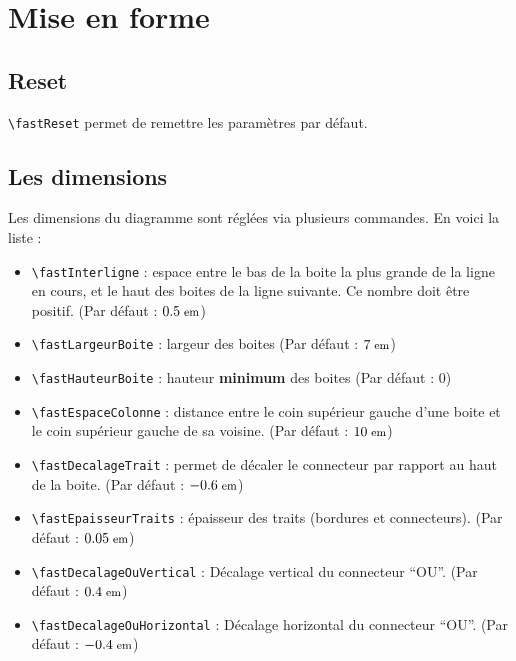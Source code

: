 \section{Mise en forme}\label{MIP}

	\subsection{Reset}\label{reset}

		{\color{blue}\verb'\fastReset'} permet de remettre les paramètres par défaut.



	\subsection{Les dimensions}\label{dimensions}

		Les dimensions du diagramme sont réglées via plusieurs commandes.
		En voici la liste :
		\begin{itemize}
			\item {\color{blue}\verb'\fastInterligne'} : espace entre le bas de la boite la plus grande de la ligne en cours, et le haut des boites de la ligne suivante.
									Ce nombre doit être positif.
									(Par défaut : $0.5\footnotesize\text{ em}$)
			\item {\color{blue}\verb'\fastLargeurBoite'} : largeur des boites (Par défaut : $7\footnotesize\text{ em}$)
			\item {\color{blue}\verb'\fastHauteurBoite'} : hauteur \textbf{minimum} des boites (Par défaut : $0$)
			\item {\color{blue}\verb'\fastEspaceColonne'} :  distance entre le coin supérieur gauche d'une boite et le coin supérieur gauche de sa voisine.
									(Par défaut : $10\footnotesize\text{ em}$)
			\item {\color{blue}\verb'\fastDecalageTrait'} : permet de décaler le connecteur par rapport au haut de la boite.
									(Par défaut : $-0.6\footnotesize\text{ em}$)
			\item {\color{blue}\verb'\fastEpaisseurTraits'} : épaisseur des traits (bordures et connecteurs). (Par défaut : $0.05\footnotesize\text{ em}$)
			\item {\color{blue}\verb'\fastDecalageOuVertical'} : Décalage vertical du connecteur ``OU''. (Par défaut : $0.4\footnotesize\text{ em}$)
			\item {\color{blue}\verb'\fastDecalageOuHorizontal'} :	Décalage horizontal du connecteur ``OU''. (Par défaut : $-0.4\footnotesize\text{ em}$)
		\end{itemize}

